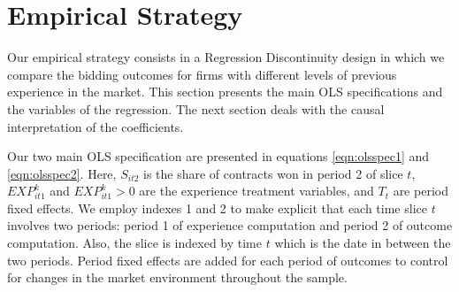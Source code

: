 



\section{Empirical Strategy}
\label{section:main_empirical}
Our empirical strategy consists in a Regression Discontinuity design in which we compare the bidding outcomes for firms with different levels of previous experience in the market. This section presents the main OLS specifications and the variables of the regression. The next section deals with the causal interpretation of the coefficients.

Our two main OLS specification are presented in equations \ref{eqn:olsspec1} and \ref{eqn:olsspec2}. Here, $S_{it2}$ is the share of contracts won in period 2 of slice $t$, $EXP^k_{it1}$ and $EXP^k_{it1}>0$ are the experience treatment variables, and $T_t$ are period fixed effects. We employ indexes 1 and 2 to make explicit that each time slice $t$ involves two periods: period 1 of experience computation and period 2 of outcome computation. Also, the slice is indexed by time $t$ which is the date in between the two periods. Period fixed effects are added for each period of outcomes to control for changes in the market environment throughout the sample.

